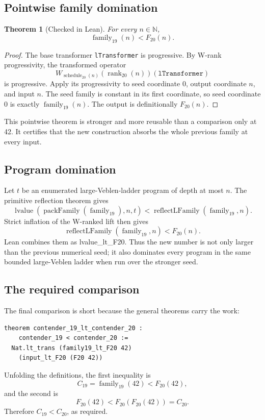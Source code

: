 \documentclass[11pt]{article}
\newtheorem{theorem}{Theorem}[section]
\theoremstyle{definition}
\newcommand{\Nat}{\mathbb{N}}
\newcommand{\code}[1]{\texttt{#1}}
\newcommand{\Cnineteen}{C_{19}}
\newcommand{\Ctwenty}{C_{20}}
\begin{document}
\subsection{Pointwise family domination}

\begin{theorem}[Checked in Lean]
For every \(n\in\Nat\),
\[
  \operatorname{family}_{19}(n)<F_{20}(n).
\]
\end{theorem}

\begin{proof}
The base transformer \code{lTransformer} is progressive.  By W-rank
progressivity, the transformed operator
\[
  W_{\operatorname{schedule}_{20}(n)}
    (\operatorname{rank}_{20}(n))(\code{lTransformer})
\]
is progressive.  Apply its progressivity to seed coordinate \(0\), output
coordinate \(n\), and input \(n\).  The seed family is constant in its first
coordinate, so seed coordinate \(0\) is exactly
\(\operatorname{family}_{19}(n)\).  The output is definitionally
\(F_{20}(n)\).
\end{proof}

This pointwise theorem is stronger and more reusable than a comparison only at
42.  It certifies that the new construction absorbs the whole previous family
at every input.

\subsection{Program domination}

Let \(t\) be an enumerated large-Veblen-ladder program of depth at most \(n\).
The primitive reflection theorem gives
\[
  \operatorname{lvalue}
    (\operatorname{packFamily}(\operatorname{family}_{19}),n,t)
  < \operatorname{reflectLFamily}
    (\operatorname{family}_{19},n).
\]
Strict inflation of the W-ranked lift then gives
\[
  \operatorname{reflectLFamily}
    (\operatorname{family}_{19},n)<F_{20}(n).
\]
Lean combines them as lvalue\_lt\_F20.  Thus the new number is not only
larger than the previous numerical seed; it also dominates every program in
the same bounded large-Veblen ladder when run over the stronger seed.

\subsection{The required comparison}

The final comparison is short because the general theorems carry the work:
\begin{lstlisting}
theorem contender_19_lt_contender_20 :
    contender_19 < contender_20 :=
  Nat.lt_trans (family19_lt_F20 42)
    (input_lt_F20 (F20 42))
\end{lstlisting}
Unfolding the definitions, the first inequality is
\[
  \Cnineteen=\operatorname{family}_{19}(42)<F_{20}(42),
\]
and the second is
\[
  F_{20}(42)<F_{20}(F_{20}(42))=\Ctwenty.
\]
Therefore \(\Cnineteen<\Ctwenty\), as required.
\end{document}
